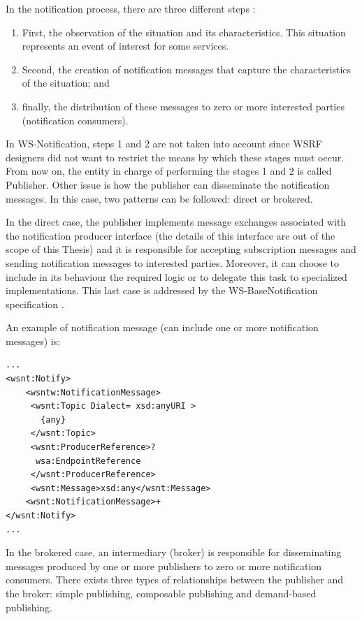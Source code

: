 In the notification process, there are three different steps \cite{WSNstandard}: 
\begin{enumerate}
\item First, the observation of the situation and its characteristics. This situation represents an event of
interest for some services.
\item Second, the creation of notification messages that capture 
the characteristics of the situation; and
\item finally, the distribution of these messages to zero or more interested parties (notification consumers).
\end{enumerate}
In WS-Notification, steps 1 and 2 are not taken into account 
since WSRF designers did not want to restrict the means by which
these stages must occur. From now on, the entity in charge of performing the stages 1 and 2 is called Publisher.
Other issue is how the publisher can disseminate the notification messages. 
In this case, two patterns can be followed: direct or brokered.

In the direct case, the publisher implements message exchanges associated with
the notification producer interface (the details of this interface are out of the scope of this Thesis)
and it is responsible for accepting subscription messages and
sending notification messages to interested parties. Moreover, it
can choose to include in its behaviour the required logic or to delegate this task to specialized implementations. 
This last case is addressed by the WS-BaseNotification
specification \cite{WSNstandard}.

An example of notification message (can include one or more notification messages) is:
 
\begin{lstlisting}
...
<wsnt:Notify>
    <wsntw:NotificationMessage>
     <wsnt:Topic Dialect= xsd:anyURI >
       {any}
     </wsnt:Topic>
     <wsnt:ProducerReference>?
      wsa:EndpointReference
     </wsnt:ProducerReference>
     <wsnt:Message>xsd:any</wsnt:Message>
    <wsnt:NotificationMessage>+
</wsnt:Notify>
...
\end{lstlisting}

In the brokered case, an intermediary (broker) is responsible for disseminating
messages produced by one or more publishers to zero
or more notification consumers. There exists three types of relationships between the publisher and the
broker: simple publishing, composable publishing and demand-based publishing.

